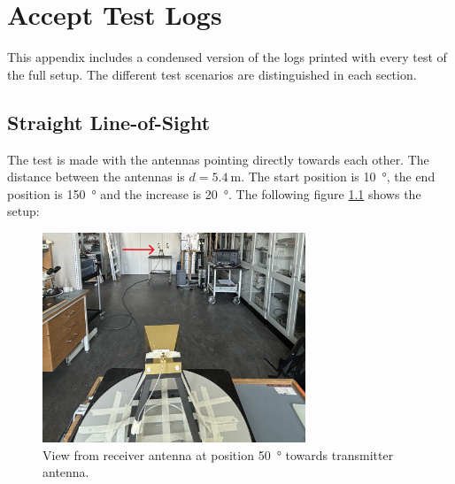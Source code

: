 \chapter{Accept Test Logs} \label{a:results}
This appendix includes a condensed version of the logs printed with every test of the full setup. The different test scenarios are distinguished in each section.

\section{Straight Line-of-Sight}
The test is made with the antennas pointing directly towards each other. The distance between the antennas is $d=\SI{5.4}{\meter}$. The start position is \SI{10}{\degree}, the end position is \SI{150}{\degree} and the increase is \SI{20}{\degree}. The following figure \ref{fig:a2_1} shows the setup:
\begin{figure}[H]
    \centering
    \includegraphics[width=0.7\textwidth]{figures/test_los_straight.JPG}
    \caption{View from receiver antenna at position \SI{50}{\degree} towards transmitter antenna.} \label{fig:a2_1}
\end{figure}

